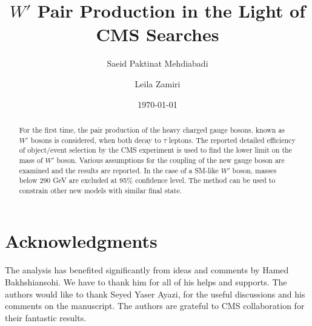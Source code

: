\documentclass[preprint,showpacs,preprintnumbers]{revtex4}
\begin{document}
\linenumbers

\title{$W'$ Pair Production in the Light of CMS Searches}




\author{Saeid Paktinat Mehdiabadi}

\author{Leila Zamiri}

\date{\today}

\begin{abstract}
For the first time, the pair production of the heavy charged gauge bosons, known as $W'$ bosons is considered, when both decay to $\tau$ leptons. The reported detailed efficiency of object/event selection by the CMS experiment is used to find the lower limit on the mass of $W'$ boson. Various assumptions for the coupling of the new gauge boson are examined and the results are reported. In the case of a SM-like $W'$ boson, masses below 290 GeV are excluded at 95\% confidence level. The method can be used to constrain other new models with similar final state.
\end{abstract}

\maketitle













\section{Acknowledgments}
The analysis has benefited significantly from ideas and comments by Hamed Bakhshiansohi. We have to thank him for all of his helps and supports. 
The authors would like to thank Seyed Yaser Ayazi, for the useful discussions and 
his comments on the manuscript. The authors are grateful to CMS collaboration for their fantastic results. 



\end{document}
